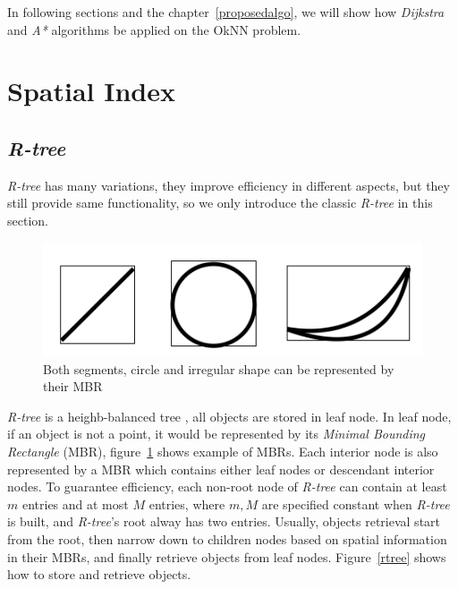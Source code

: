 In following sections and the chapter~\ref{proposedalgo}, we will show how \textit{Dijkstra} and
\textit{A*} algorithms be applied on the OkNN problem.

\section{Spatial Index}\label{lrindex}

\subsection{\textit{R-tree}}

\textit{R-tree} has many variations\cite{guttman1984r,beckmann1990r,sellis1987r+,kamel1993hilbert},
they improve efficiency in different aspects,
but they still provide same functionality,
so we only introduce the classic \textit{R-tree} in this section.

\begin{figure}[htp]
  \centering
  \includegraphics[width=.8\linewidth]{pic/mbr.PNG}
  \caption{\small Both segments, circle and irregular shape can be represented by their MBR}
  \label{mbr}
\end{figure}

\textit{R-tree} is a heighb-balanced tree \cite{guttman1984r}, all objects are stored in leaf
node. In leaf node, if an object is not a point, it would be represented by its \textit{Minimal Bounding
Rectangle} (MBR), figure~\ref{mbr} shows example of MBRs. Each interior node is also
represented by a MBR which contains either leaf nodes or descendant interior nodes.
To guarantee efficiency, each non-root node of \textit{R-tree} can contain at least $m$ entries
and at most $M$ entries, where $m, M$ are specified constant when \textit{R-tree} is built, and
\textit{R-tree}'s root alway has two entries. 
Usually, objects retrieval start from the root,
then narrow down to children nodes based on spatial information in their MBRs, and finally
retrieve objects from leaf nodes.
Figure~\ref{rtree} shows how to store and retrieve objects.

